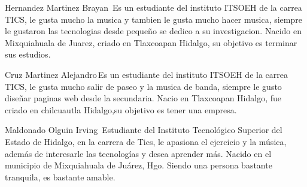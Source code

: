 \documentclass{IEEEcsmag}
\begin{document}
\begin{IEEEbiography}{Hernandez Martinez Brayan}{\,} Es un estudiante del instituto ITSOEH de la carrea TICS, le gusta mucho la musica y tambien le gusta mucho hacer musica, siempre le gustaron las tecnologias desde pequeño se dedico a su investigacion. Nacido en Mixquiahuala de Juarez, criado en Tlaxcoapan Hidalgo, su objetivo es terminar sus estudios.
    \end{IEEEbiography}
\begin{IEEEbiography}{Cruz Martinez Alejandro}{\,}Es un estudiante del instituto ITSOEH de la carrea TICS, le gusta mucho salir de paseo y la musica de banda, siempre le gusto diseñar paginas web desde la secundaria. Nacio en Tlaxcoapan Hidalgo, fue criado en chilcuautla Hidalgo,su objetivo es tener una empresa.

    \begin{IEEEbiography}{Maldonado Olguin Irving}{\,} Estudiante del Instituto Tecnológico Superior del Estado de Hidalgo, en la carrera de Tics, le apasiona el ejercicio y la música, además de interesarle las tecnologías y desea aprender más. Nacido en el municipio de Mixquiahuala de Juárez, Hgo. Siendo una persona bastante tranquila, es bastante amable.
        \end{IEEEbiography}
    
\end{IEEEbiography}
\end{document}

